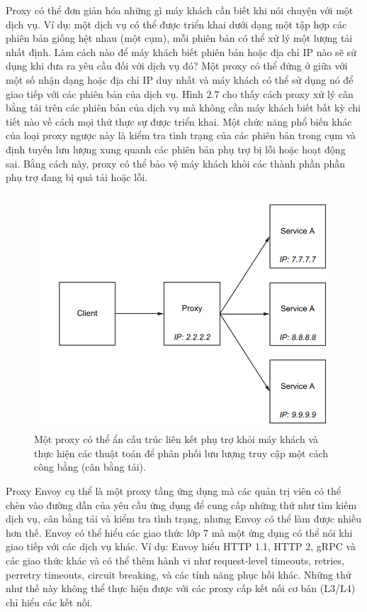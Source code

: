 \documentclass[12pt,a4paper]{report}
\begin{document}
		Proxy có thể đơn giản hóa những gì máy khách cần biết khi nói chuyện với một dịch vụ. Ví dụ: một dịch vụ có thể được triển khai dưới dạng một tập hợp các phiên bản giống hệt nhau (một cụm), mỗi phiên bản có thể xử lý một lượng tải nhất định. Làm cách nào để máy khách biết phiên bản hoặc địa chỉ IP nào sẽ sử dụng khi đưa ra yêu cầu đối với dịch vụ đó? Một proxy có thể đứng ở giữa với một số nhận dạng hoặc địa chỉ IP duy nhất và máy khách có thể sử dụng nó để giao tiếp với các phiên bản của dịch vụ. Hình 2.7 cho thấy cách proxy xử lý cân bằng tải trên các phiên bản của dịch vụ mà không cần máy khách biết bất kỳ chi tiết nào về cách mọi thứ thực sự được triển khai. Một chức năng phổ biến khác của loại proxy ngược này là kiểm tra tình trạng của các phiên bản trong cụm và định tuyến lưu lượng xung quanh các phiên bản phụ trợ bị lỗi hoặc hoạt động sai. Bằng cách này, proxy có thể bảo vệ máy khách khỏi các thành phần phần phụ trợ đang bị quá tải hoặc lỗi.
		
		\begin{figure}[h]
			\centering
			\includegraphics[width=0.7\linewidth]{Pics/2.1.3-p2}
			\caption{Một proxy có thể ẩn cấu trúc liên kết phụ trợ khỏi máy khách và thực hiện các thuật toán để phân phối lưu lượng truy cập một cách công bằng (cân bằng tải).}
			\label{fig:2.1.3-2}
		\end{figure}
		
		Proxy Envoy cụ thể là một proxy tầng ứng dụng mà các quản trị viên có thể chèn vào đường dẫn của yêu cầu ứng dụng để cung cấp những thứ như tìm kiếm dịch vụ, cân bằng tải và kiểm tra tình trạng, nhưng Envoy có thể làm được nhiều hơn thế. Envoy có thể hiểu các giao thức lớp 7 mà một ứng dụng có thể nói khi giao tiếp với các dịch vụ khác. Ví dụ: Envoy hiểu HTTP 1.1, HTTP 2, gRPC và các giao thức khác và có thể thêm hành vi như request-level timeouts, retries, perretry timeouts, circuit breaking, và các tính năng phục hồi khác. Những thứ như thế này không thể thực hiện được với các proxy cấp kết nối cơ bản (L3/L4) chỉ hiểu các kết nối.
		
\end{document}
